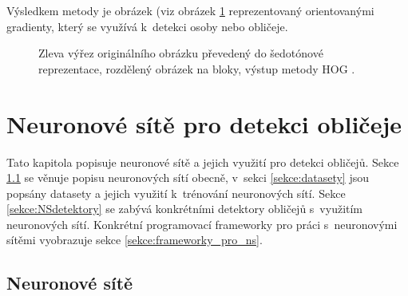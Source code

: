 Výsledkem metody je obrázek (viz obrázek \ref{hogexample} reprezentovaný orientovanými gradienty, který se využívá k~detekci osoby nebo obličeje.

\begin{figure}[H]
  \begin{center}
  \label{hogexample}
  \caption{Zleva výřez originálního obrázku převedený do šedotónové reprezentace, rozdělený obrázek na bloky, výstup metody HOG \cite{hog2}.}
  \end{center}
\end{figure}


\chapter{Neuronové sítě pro detekci obličeje}
\label{kapitola:neuronove_site}
Tato kapitola popisuje neuronové sítě a jejich využití pro detekci obličejů. Sekce \ref{sekce:NS} se věnuje popisu neuronových sítí obecně, v~sekci \ref{sekce:datasety} jsou popsány datasety a jejich využití k~trénování neuronových sítí. Sekce \ref{sekce:NSdetektory} se zabývá konkrétními detektory obličejů s~využitím neuronových sítí. Konkrétní programovací frameworky pro práci s~neuronovými sítěmi vyobrazuje sekce \ref{sekce:frameworky_pro_ns}.

\section{Neuronové sítě}
\label{sekce:NS}

